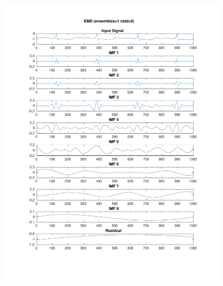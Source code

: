 \documentclass[11pt,a4paper]{article}
\begin{document}
\begin{figure}[H]
\centering
\begin{minipage}{0.48\textwidth}
	\centering
	\includegraphics[width=\textwidth]{fig/112l1_emd.pdf}
\end{minipage}
\begin{minipage}{0.48\textwidth}
	\centering

\end{minipage}
\end{figure}
\end{document}
